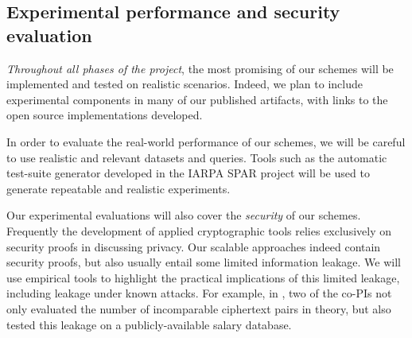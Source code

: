 

\subsection{Experimental performance and security evaluation}

\emph{Throughout all phases of the project}, the most promising of our
schemes will be implemented and tested on realistic scenarios.
Indeed, we plan to include
experimental components in many of our published artifacts, with
links to the open source implementations developed.

In order to evaluate the real-world performance of our schemes, we will
be careful to use realistic and relevant datasets and queries. Tools
such as the automatic test-suite generator developed in the IARPA SPAR
project \cite{HH14,varia2015automated} will be used to generate
repeatable and realistic experiments.

Our experimental evaluations will also cover the \emph{security} of our
schemes. Frequently the development of applied cryptographic tools
relies exclusively on security proofs in
discussing privacy. Our scalable approaches indeed contain security
proofs, but also usually entail some limited information leakage.
We will use empirical tools to highlight the practical
implications of this limited leakage, including leakage under known
attacks. For example, in \cite{CCS:RACY16}, two of the co-PIs not only
evaluated the number of incomparable ciphertext pairs in theory, but
also tested this leakage on a publicly-available salary database.

